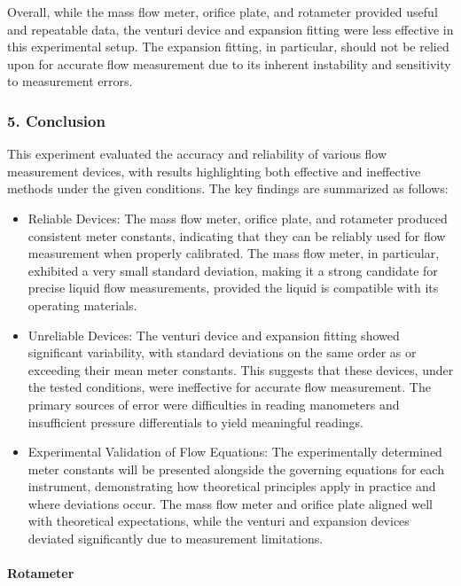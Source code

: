 \documentclass[11pt]{article}
\begin{document}
Overall, while the mass flow meter, orifice plate, and rotameter
provided useful and repeatable data, the venturi device and expansion
fitting were less effective in this experimental setup. The expansion
fitting, in particular, should not be relied upon for accurate flow
measurement due to its inherent instability and sensitivity to
measurement errors.

    \hypertarget{conclusion}{%
\subsubsection{5. Conclusion}\label{conclusion}}

This experiment evaluated the accuracy and reliability of various flow
measurement devices, with results highlighting both effective and
ineffective methods under the given conditions. The key findings are
summarized as follows:

\begin{itemize}
\item
  Reliable Devices: The mass flow meter, orifice plate, and rotameter
  produced consistent meter constants, indicating that they can be
  reliably used for flow measurement when properly calibrated. The mass
  flow meter, in particular, exhibited a very small standard deviation,
  making it a strong candidate for precise liquid flow measurements,
  provided the liquid is compatible with its operating materials.
\item
  Unreliable Devices: The venturi device and expansion fitting showed
  significant variability, with standard deviations on the same order as
  or exceeding their mean meter constants. This suggests that these
  devices, under the tested conditions, were ineffective for accurate
  flow measurement. The primary sources of error were difficulties in
  reading manometers and insufficient pressure differentials to yield
  meaningful readings.
\item
  Experimental Validation of Flow Equations: The experimentally
  determined meter constants will be presented alongside the governing
  equations for each instrument, demonstrating how theoretical
  principles apply in practice and where deviations occur. The mass flow
  meter and orifice plate aligned well with theoretical expectations,
  while the venturi and expansion devices deviated significantly due to
  measurement limitations.
\end{itemize}

\hypertarget{rotameter}{%
\paragraph{Rotameter}\label{rotameter}}
\end{document}
